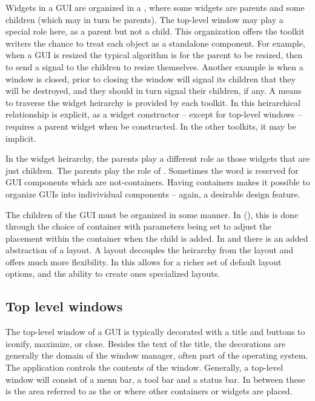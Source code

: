 Widgets in a GUI are organized in a , where some
widgets are parents and some children (which may in turn be
parents). The top-level window may play a special role here, as a
parent but not a child. This organization offers the toolkit writers
the chance to treat each object as a standalone component. For
example, when a GUI is resized the typical algorithm is for the parent
to be resized, then to send a signal to the children to resize
themselves. Another example is when a window is closed, prior to
closing the window will signal its children that they will be
destroyed, and they should in turn signal their children, if any.  A
means to traverse the widget heirarchy is provided by each toolkit.
In  this heirarchical relationship is explicit, as a widget
constructor -- except for top-level windows -- requires a parent
widget when be constructed. In the other toolkits, it may be implicit.

In the widget heirarchy, the parents play a different role as those
widgets that are just children. The parents play the role of
. Sometimes the word  is reserved for GUI
components which are not-containers. Having containers makes it
possible to organize GUIs into indivividual components -- again, a desirable
design feature.

The children of the GUI must be organized in some manner. In \GTK
(), this is done through the choice of container with
parameters being set to adjust the placement within the container when
the child is added. In \Qt\/ and \tcltk\/ there is an added
abstraction of a layout. A layout decouples the heirarchy from the
layout and offers much more flexibility. In \Qt\/ this allows for a
richer set of default layout options, and the ability to create ones
specialized layouts.



\subsection{Top level windows}
\label{sec:GUI:top-level-windows}

The top-level window of a GUI is typically decorated with a title and
buttons to iconify, maximize, or close. Besides the text of the title,
the decorations are generally the domain of the window manager, often
part of the operating system. The application controls the contents of
the window. Generally, a top-level window will consist of a menu bar,
a tool bar and a status bar. In between these is the area referred to
as the  or  where other
containers or widgets are placed.

